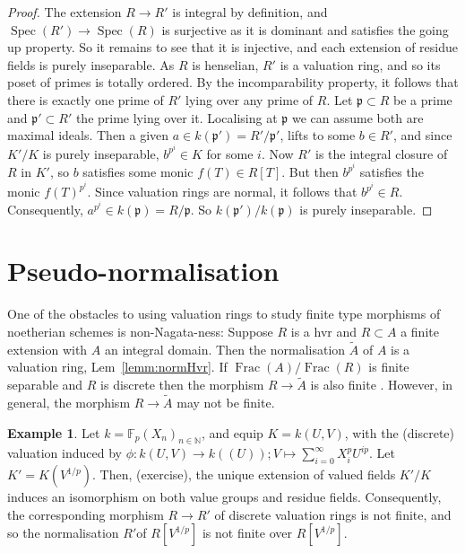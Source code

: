 \documentclass[10pt]{amsart}
\theoremstyle{definition}
\newtheorem{exam}[theo]{Example}
\newtheorem{rema}[theo]{Remark}
\newcommand{\FF}{\mathbb{F}}
\newcommand{\NN}{\mathbb{N}}
\newcommand{\p}{\mathfrak{p}}
\DeclareMathOperator{\Spec}{Spec}
\DeclareMathOperator{\Frac}{Frac}
\newcommand{\fpsl}{{\operatorname{fps\!}l'}}
\begin{document}


\begin{proof}
The extension $R \to R'$ is integral by definition, and $\Spec(R') \to \Spec(R)$ is surjective as it is dominant and satisfies the going up property. %
So it remains to see that it is injective, and each extension of residue fields is purely inseparable. As $R$ is henselian, $R'$ is a valuation ring, and so its poset of primes is totally ordered. By the incomparability property, it follows that there is exactly one prime of $R'$ lying over any prime of $R$. Let $\p \subset R$ be a prime and $\p' \subset R'$ the prime lying over it. Localising at $\p$ we can assume both are maximal ideals. Then a given $a \in k(\p') = R' / \p'$, lifts to some $b \in R'$, and since $K' / K$ is purely inseparable, $b^{p^i} \in K$ for some $i$.  Now $R'$ is the integral closure of $R$ in $K'$, so $b$ satisfies some monic $f(T) \in R[T]$. But then $b^{p^i}$ satisfies the monic $f(T)^{p^i}$. Since valuation rings are normal, it follows that $b^{p^i} \in R$. Consequently, $a^{p^i} \in k(\p) = R / \p$. So $k(\p') / k(\p)$ is purely inseparable.
\end{proof}

\section{Pseudo-normalisation} \label{sec:pn}

One of the obstacles to using valuation rings to study finite type morphisms of noetherian schemes is non-Nagata-ness: Suppose $R$ is a hvr and $R \subset A$ a finite extension with $A$ an integral domain. Then the normalisation $\widetilde{A}$ of $A$ is a valuation ring, Lem~\ref{lemm:normHvr}. If $\Frac(A) / \Frac(R)$ is finite separable and $R$ is discrete then the morphism $R \to \widetilde{A}$ is also finite \cite[Chap.6,Sec.8,No.5,Thm.2,Cor.1]{Bou64}. However, in general, the morphism $R {\to} \widetilde{A}$ may not be finite. 

\begin{exam} {\cite[Chap.6,Sec.8,Exercise 3b]{Bou64}} \label{exam:nonNagata}
Let $k = \FF_p(X_n)_{n \in \NN}$, and equip $K = k(U, V)$, with the (discrete) valuation induced by $\phi: k(U, V) \to k((U)); V \mapsto \sum_{i = 0}^\infty X^p_i U^{ip}$. Let $K' = K(V^{1/p})$. Then, (exercise), the unique extension of valued fields $K'/K$ induces an isomorphism on both value groups and residue fields. Consequently, the corresponding morphism $R \to R'$ of discrete valuation rings is not finite, and so the normalisation $R'$of $R[V^{1/p}]$ is not finite over $R[V^{1/p}]$.
\end{exam}
\end{document}
